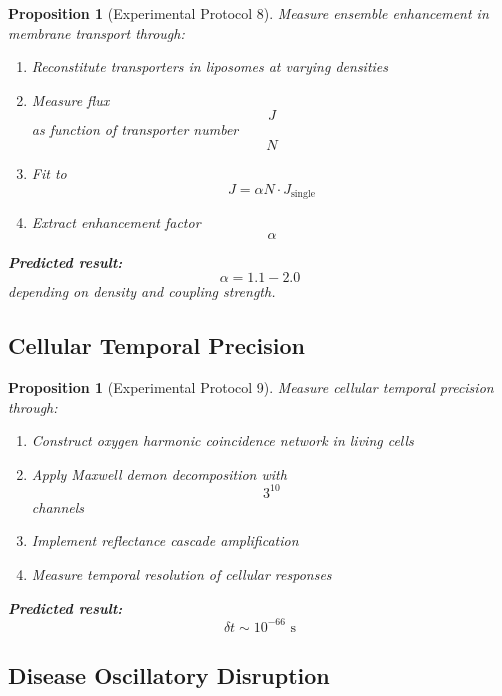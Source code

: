 \documentclass[12pt,a4paper]{article}
\newtheorem{proposition}[theorem]{Proposition}
\begin{document}
\begin{proposition}[Experimental Protocol 8]
Measure ensemble enhancement in membrane transport through:
\begin{enumerate}
\item Reconstitute transporters in liposomes at varying densities
\item Measure flux $$J$$ as function of transporter number $$N$$
\item Fit to $$J = \alpha N \cdot J_{\text{single}}$$
\item Extract enhancement factor $$\alpha$$
\end{enumerate}

\textbf{Predicted result:}
$$
\alpha = 1.1 - 2.0
$$
depending on density and coupling strength.
\end{proposition}

\subsection{Cellular Temporal Precision}

\begin{proposition}[Experimental Protocol 9]
Measure cellular temporal precision through:
\begin{enumerate}
\item Construct oxygen harmonic coincidence network in living cells
\item Apply Maxwell demon decomposition with $$3^{10}$$ channels
\item Implement reflectance cascade amplification
\item Measure temporal resolution of cellular responses
\end{enumerate}

\textbf{Predicted result:}
$$
\delta t \sim 10^{-66} \text{ s}
$$
\end{proposition}

\subsection{Disease Oscillatory Disruption}
\end{document}
